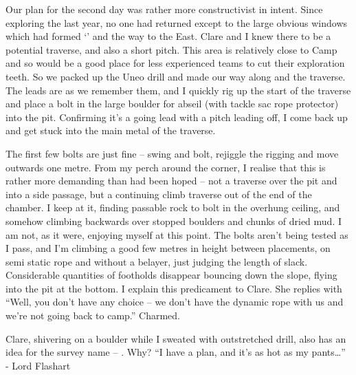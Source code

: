 
Our plan for the second day was rather more constructivist in intent.
Since exploring the  last year, no one had returned
except to the large obvious windows which had formed `' and the way to the East. Clare and I knew there to be a
potential traverse, and also a short pitch. This area is relatively
close to Camp  and so would be a good place for less
experienced teams to cut their exploration teeth. So we packed up the Uneo drill and
made our way along  and the  traverse. The leads are as
we remember them, and I quickly rig up the start of the traverse and
place a bolt in the large boulder for abseil (with tackle sac rope
protector) into the pit. Confirming it's a going lead with a pitch
leading off, I come back up and get stuck into the main metal of the
traverse.


The first few bolts are just fine -- swing and bolt, rejiggle the
rigging and move outwards one metre. From my perch around the corner, I
realise that this is rather more demanding than had been hoped -- not a
traverse over the pit and into a side passage, but a continuing climb
traverse out of the end of the chamber. I keep at it, finding passable
rock to bolt in the overhung ceiling, and somehow climbing backwards
over stopped boulders and chunks of dried mud. I am not, as it were,
enjoying myself at this point. The bolts aren't being tested as I pass,
and I'm climbing a good few metres in height between placements, on semi
static rope and without a belayer, just judging the length of slack.
Considerable quantities of footholds disappear bouncing down the slope,
flying into the pit at the bottom. I explain this predicament to Clare.
She replies with ``Well, you don't have any choice -- we don't have the
dynamic rope with us and we're not going back to camp.'' Charmed.

Clare, shivering on a boulder while I sweated with outstretched drill,
also has an idea for the survey name -- . Why? ``I have a plan,
and it's as hot as my pants\ldots{}'' - Lord Flashart

